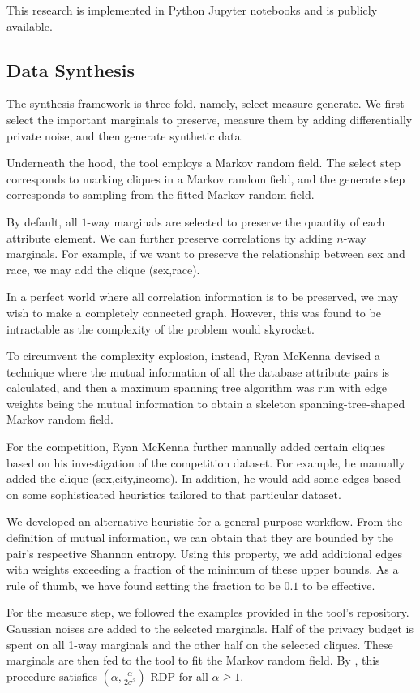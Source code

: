 \documentclass[acmsmall,sigconf]{acmart}
\begin{document}
This research is implemented in Python Jupyter notebooks and is publicly available.

\subsection{Data Synthesis}

The synthesis framework is three-fold, namely, select-measure-generate\cite{McKenna2022}. We first select the important marginals to preserve, measure them by adding differentially private noise, and then generate synthetic data.

Underneath the hood, the tool employs a Markov random field. The select step corresponds to marking cliques in a Markov random field, and the generate step corresponds to sampling from the fitted Markov random field.

By default, all $1$-way marginals are selected to preserve the quantity of each attribute element. We can further preserve correlations by adding $n$-way marginals. For example, if we want to preserve the relationship between sex and race, we may add the clique (sex,race).

In a perfect world where all correlation information is to be preserved, we may wish to make a completely connected graph. However, this was found to be intractable as the complexity of the problem would skyrocket.

To circumvent the complexity explosion, instead, Ryan McKenna devised a technique where the mutual information of all the database attribute pairs is calculated, and then a maximum spanning tree algorithm was run with edge weights being the mutual information to obtain a skeleton spanning-tree-shaped Markov random field.

For the competition, Ryan McKenna further manually added certain cliques based on his investigation of the competition dataset. For example, he manually added the clique (sex,city,income). In addition, he would add some edges based on some sophisticated heuristics tailored to that particular dataset.

We developed an alternative heuristic for a general-purpose workflow. From the definition of mutual information, we can obtain that they are bounded by the pair's respective Shannon entropy. Using this property, we add additional edges with weights exceeding a fraction of the minimum of these upper bounds. As a rule of thumb, we have found setting the fraction to be $0.1$ to be effective.

For the measure step, we followed the examples provided in the tool's repository. Gaussian noises are added to the selected marginals. Half of the privacy budget is spent on all 1-way marginals and the other half on the selected cliques. These marginals are then fed to the tool to fit the Markov random field. By \cite{mckenna2021winning}, this procedure satisfies $(\alpha,\frac{\alpha}{2 \sigma^2})$-RDP for all $\alpha \geq 1$.
\end{document}
